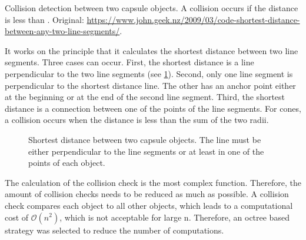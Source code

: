 % 
\begin{lstfloat}[!t]
    \caption[]{Collision detection between two capsule objects. A collision occurs if the distance is less than . Original: \href{https://www.john.geek.nz/2009/03/code-shortest-distance-between-any-two-line-segments/}{https://www.john.geek.nz/2009/03/code-shortest-distance-between-any-two-line-segments/}.}
    \label{alg:pseudocodeCollisionDetection}
\end{lstfloat}
%
It works on the principle that it calculates the shortest distance between two line segments.
Three cases can occur.
First, the shortest distance is a line perpendicular to the two line segments (see \cref{fig:shortDist}).
Second, only one line segment is perpendicular to the shortest distance line.
The other has an anchor point either at the beginning or at the end of the second line segment.
Third, the shortest distance is a connection between one of the points of the line segments.
For cones, a collision occurs when the distance is less than the sum of the two radii.
\par
% 
\begin{figure}[!t]
    \centering
    \def\tikzheight{0.5\textwidth}
	\caption[]{Shortest distance between two capsule objects. The line must be either perpendicular to the line segments or at least in one of the points of each object.}
	\label{fig:shortDist}
\end{figure}
% 
The calculation of the collision check is the most complex function.
Therefore, the amount of collision checks needs to be reduced as much as possible.
A collision check compares each object to all other objects, which leads to a computational cost of $\mathcal{O}(n^{2})$, which is not acceptable for large n.
Therefore, an octree based strategy was selected to reduce the number of computations.
%
% 
% 
